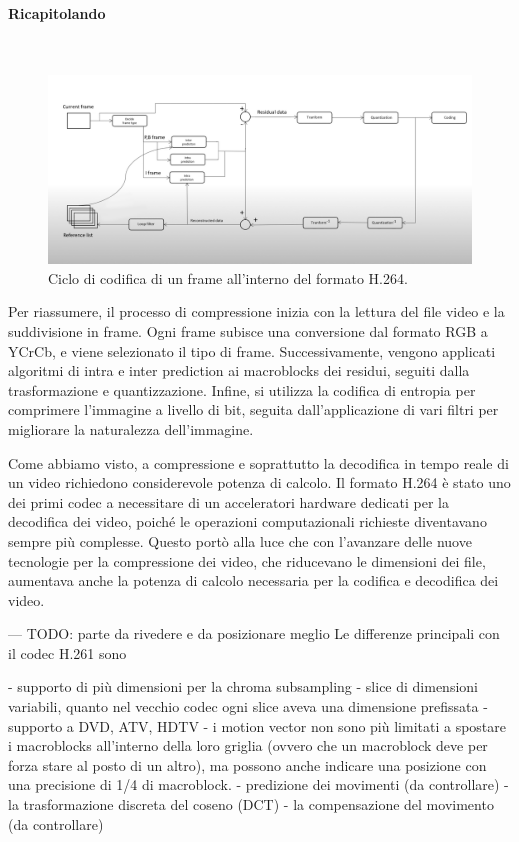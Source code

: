 \documentclass[a4paper,12pt, oneside]{article}
\begin{document}
\paragraph{Ricapitolando}\hphantom{A}\\
\begin{figure}[h]
    \centering
    \includegraphics[width=1\textwidth]{images/h264-coding-loop.png}
    \caption{Ciclo di codifica di un frame all'interno del formato H.264.}
    \label{fig:h264_coding_loop}
\end{figure}

\noindent Per riassumere, il processo di compressione inizia con la lettura del file video e la
suddivisione in frame. Ogni frame subisce una conversione dal formato RGB a YCrCb, e viene
selezionato il tipo di frame. Successivamente, vengono applicati algoritmi di intra e inter prediction
ai macroblocks dei residui, seguiti dalla trasformazione e quantizzazione. Infine, si utilizza la
codifica di entropia per comprimere l'immagine a livello di bit, seguita dall'applicazione di vari
filtri per migliorare la naturalezza dell'immagine.

Come abbiamo visto, a compressione e soprattutto la decodifica in tempo reale di un video richiedono
considerevole potenza di calcolo. Il formato H.264 è stato uno dei primi codec a necessitare di un
acceleratori hardware dedicati per la decodifica dei video, poiché le operazioni computazionali richieste
diventavano sempre più complesse. Questo portò alla luce che con l'avanzare delle nuove tecnologie per
la compressione dei video, che riducevano le dimensioni dei file, aumentava anche la potenza di calcolo
necessaria per la codifica e decodifica dei video.

---
TODO: parte da rivedere e da posizionare meglio
Le differenze principali con il codec H.261 sono

- supporto di più dimensioni per la chroma subsampling
- slice di dimensioni variabili, quanto nel vecchio codec ogni slice aveva una dimensione prefissata
- supporto a DVD, ATV, HDTV
- i motion vector non sono più limitati a spostare i macroblocks all'interno della loro griglia
(ovvero che un macroblock deve per forza stare al posto di un altro), ma possono anche indicare una
posizione con una precisione di 1/4 di macroblock.
- predizione dei movimenti  (da controllare)
- la trasformazione discreta del coseno (DCT)
- la compensazione del movimento (da controllare)
\end{document}
